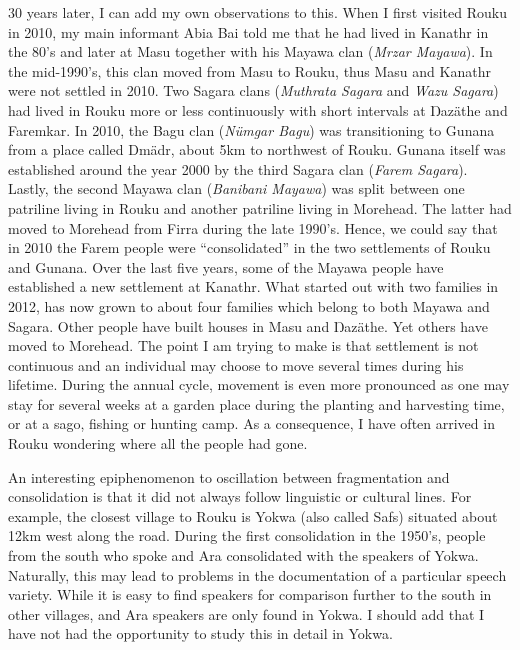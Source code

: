 30 years later, I can add my own observations to this. When I first visited Rouku in 2010, my main informant Abia Bai told me that he had lived in Kanathr in the 80's and later at Masu together with his Mayawa clan (\emph{Mrzar Mayawa}). In the mid-1990's, this clan moved from Masu to Rouku, thus Masu and Kanathr were not settled in 2010. Two Sagara clans (\emph{Muthrata Sagara} and \emph{Wazu Sagara}) had lived in Rouku more or less continuously with short intervals at Ŋazäthe and Faremkar. In 2010, the Bagu clan (\emph{Nümgar Bagu}) was transitioning to Gunana from a place called Dmädr, about 5km to northwest of Rouku. Gunana itself was established around the year 2000 by the third Sagara clan (\emph{Farem Sagara}). Lastly, the second Mayawa clan (\emph{Banibani Mayawa}) was split between one patriline living in Rouku and another patriline living in Morehead. The latter had moved to Morehead from Firra during the late 1990's. Hence, we could say that in 2010 the Farem people were ``consolidated'' in the two settlements of Rouku and Gunana. Over the last five years, some of the Mayawa people have established a new settlement at Kanathr. What started out with two families in 2012, has now grown to about four families which belong to both Mayawa and Sagara. Other people have built houses in Masu and Ŋazäthe. Yet others have moved to Morehead. The point I am trying to make is that settlement is not continuous and an individual may choose to move several times during his lifetime. During the annual cycle, movement is even more pronounced as one may stay for several weeks at a garden place during the planting and harvesting time, or at a sago, fishing or hunting camp. As a consequence, I have often arrived in Rouku wondering where all the people had gone.%

An interesting epiphenomenon to oscillation between fragmentation and consolidation is that it did not always follow linguistic or cultural lines. For example, the closest village to Rouku is Yokwa (also called Safs) situated about 12km west along the road. During the first consolidation in the 1950's, people from the south who spoke  and Ara consolidated with the  speakers of Yokwa. Naturally, this may lead to problems in the documentation of a particular speech variety. While it is easy to find  speakers for comparison further to the south in other villages,  and Ara speakers are only found in Yokwa. I should add that I have not had the opportunity to study this in detail in Yokwa.%

